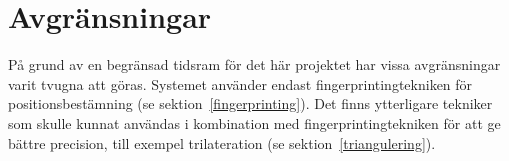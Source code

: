 \documentclass[a4paper,12pt]{article}
\begin{document}



 \section{Avgränsningar}
 På grund av en begränsad tidsram för det här projektet har vissa avgränsningar varit tvugna att göras. Systemet använder endast fingerprintingtekniken för positionsbestämning (se sektion~\ref{fingerprinting}). Det finns ytterligare tekniker som skulle kunnat användas i kombination med fingerprintingtekniken för att ge bättre precision, till exempel trilateration (se sektion~\ref{triangulering}).
\end{document}
